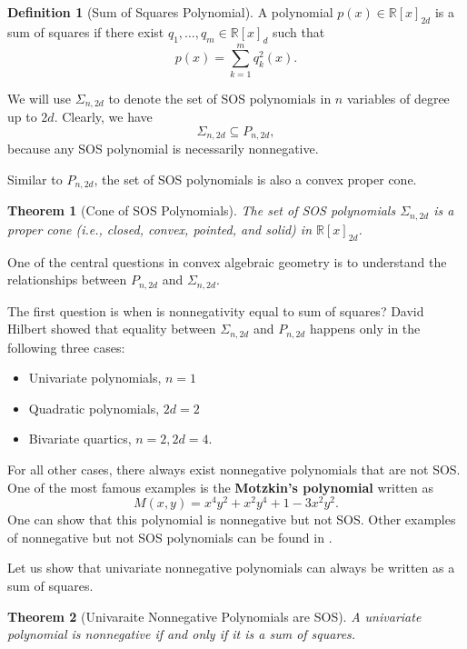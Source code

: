 \documentclass[
]{book}
\newtheorem{theorem}{Theorem}[chapter]
\theoremstyle{definition}
\newtheorem{definition}{Definition}[chapter]
\theoremstyle{definition}
\theoremstyle{definition}
\theoremstyle{definition}
\theoremstyle{remark}
\begin{document}
\begin{definition}[Sum of Squares Polynomial]
\protect\hypertarget{def:SumOfSquares}{}\label{def:SumOfSquares}A polynomial \(p(x) \in \mathbb{R}[x]_{2d}\) is a sum of squares if there exist \(q_1,\dots,q_m \in \mathbb{R}[x]_d\) such that
\[
p(x) = \sum_{k=1}^m q_k^2(x).
\]
\end{definition}

We will use \(\Sigma_{n,2d}\) to denote the set of SOS polynomials in \(n\) variables of degree up to \(2d\). Clearly, we have
\[
\Sigma_{n,2d} \subseteq P_{n,2d},
\]
because any SOS polynomial is necessarily nonnegative.

Similar to \(P_{n,2d}\), the set of SOS polynomials is also a convex proper cone.

\begin{theorem}[Cone of SOS Polynomials]
\protect\hypertarget{thm:ConeSOSPolynomial}{}\label{thm:ConeSOSPolynomial}The set of SOS polynomials \(\Sigma_{n,2d}\) is a proper cone (i.e., closed, convex, pointed, and solid) in \(\mathbb{R}[x]_{2d}\).
\end{theorem}

One of the central questions in convex algebraic geometry is to understand the relationships between \(P_{n,2d}\) and \(\Sigma_{n,2d}\).

The first question is when is nonnegativity equal to sum of squares? David Hilbert showed that equality between \(\Sigma_{n,2d}\) and \(P_{n,2d}\) happens only in the following three cases:

\begin{itemize}
\item
  Univariate polynomials, \(n=1\)
\item
  Quadratic polynomials, \(2d=2\)
\item
  Bivariate quartics, \(n=2, 2d=4\).
\end{itemize}

For all other cases, there always exist nonnegative polynomials that are not SOS. One of the most famous examples is the \textbf{Motzkin's polynomial} written as
\[
M(x,y) = x^4 y^2 + x^2 y^4 + 1 - 3 x^2 y^2.
\]
One can show that this polynomial is nonnegative but not SOS. Other examples of nonnegative but not SOS polynomials can be found in \citep{reznick00cm-some}.

Let us show that univariate nonnegative polynomials can always be written as a sum of squares.

\begin{theorem}[Univaraite Nonnegative Polynomials are SOS]
\protect\hypertarget{thm:UnivaraiteNonSOS}{}\label{thm:UnivaraiteNonSOS}A univariate polynomial is nonnegative if and only if it is a sum of squares.
\end{theorem}
\end{document}
